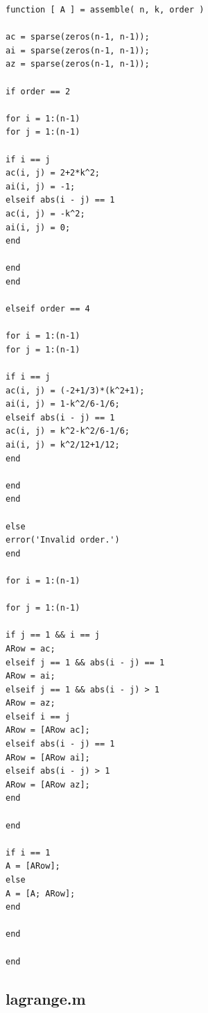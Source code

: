 \documentclass[10pt]{article}		%
\numberwithin{equation}{section}
\begin{document}
\begin{lstlisting}
function [ A ] = assemble( n, k, order )

ac = sparse(zeros(n-1, n-1));
ai = sparse(zeros(n-1, n-1));
az = sparse(zeros(n-1, n-1));

if order == 2

for i = 1:(n-1)
for j = 1:(n-1)

if i == j
ac(i, j) = 2+2*k^2;
ai(i, j) = -1;
elseif abs(i - j) == 1
ac(i, j) = -k^2;
ai(i, j) = 0;
end

end
end

elseif order == 4

for i = 1:(n-1)
for j = 1:(n-1)

if i == j
ac(i, j) = (-2+1/3)*(k^2+1);
ai(i, j) = 1-k^2/6-1/6;
elseif abs(i - j) == 1
ac(i, j) = k^2-k^2/6-1/6;
ai(i, j) = k^2/12+1/12;
end

end
end

else
error('Invalid order.')
end

for i = 1:(n-1)

for j = 1:(n-1)

if j == 1 && i == j
ARow = ac;
elseif j == 1 && abs(i - j) == 1
ARow = ai;
elseif j == 1 && abs(i - j) > 1
ARow = az;
elseif i == j
ARow = [ARow ac];
elseif abs(i - j) == 1
ARow = [ARow ai];
elseif abs(i - j) > 1
ARow = [ARow az];
end

end

if i == 1
A = [ARow];
else
A = [A; ARow];
end

end

end
\end{lstlisting}

\subsection{lagrange.m}
\end{document}
